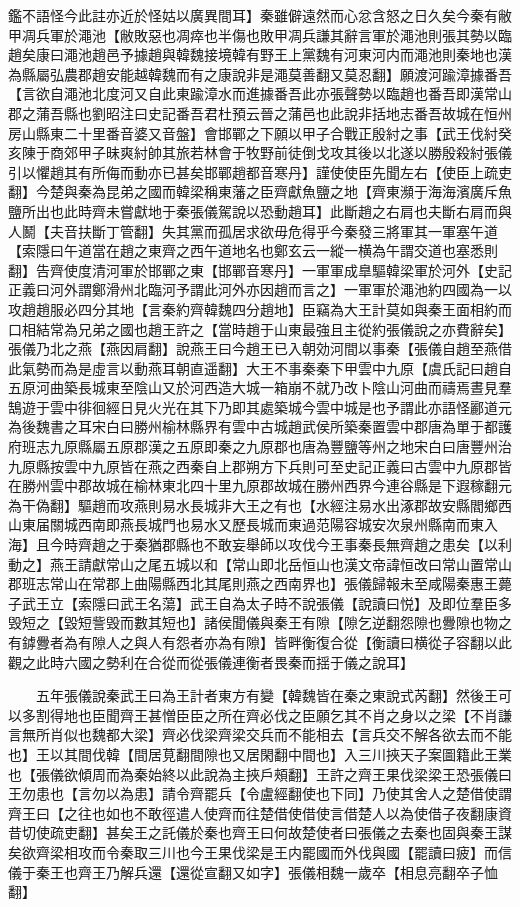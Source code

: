 鑑不語怪今此註亦近於怪姑以廣異間耳】秦雖僻遠然而心忿含怒之日久矣今秦有敝甲凋兵軍於澠池【敝敗惡也凋瘁也半傷也敗甲凋兵謙其辭言軍於澠池則張其勢以臨趙矣康曰澠池趙邑予據趙與韓魏接境韓有野王上黨魏有河東河内而澠池則秦地也漢為縣屬弘農郡趙安能越韓魏而有之康說非是澠莫善翻又莫忍翻】願渡河踰漳據番吾【言欲自澠池北度河又自此東踰漳水而進據番吾此亦張聲勢以臨趙也番吾即漢常山郡之蒲吾縣也劉昭注曰史記番吾君杜預云晉之蒲邑也此說非括地志番吾故城在恒州房山縣東二十里番音婆又音盤】會邯鄲之下願以甲子合戰正殷紂之事【武王伐紂癸亥陳于商郊甲子昧爽紂帥其旅若林會于牧野前徒倒戈攻其後以北遂以勝殷殺紂張儀引以懼趙其有所侮而動亦已甚矣邯鄲趙都音寒丹】謹使使臣先聞左右【使臣上疏吏翻】今楚與秦為昆弟之國而韓梁稱東藩之臣齊獻魚鹽之地【齊東瀕于海海濱廣斥魚鹽所出也此時齊未嘗獻地于秦張儀駕說以恐動趙耳】此斷趙之右肩也夫斷右肩而與人鬭【夫音扶斷丁管翻】失其黨而孤居求欲毋危得乎今秦發三將軍其一軍塞午道【索隱曰午道當在趙之東齊之西午道地名也鄭玄云一縱一横為午謂交道也塞悉則翻】告齊使度清河軍於邯鄲之東【邯鄲音寒丹】一軍軍成臯驅韓梁軍於河外【史記正義曰河外謂鄭滑州北臨河予謂此河外亦因趙而言之】一軍軍於澠池約四國為一以攻趙趙服必四分其地【言秦約齊韓魏四分趙地】臣竊為大王計莫如與秦王面相約而口相結常為兄弟之國也趙王許之【當時趙于山東最強且主從約張儀說之亦費辭矣】張儀乃北之燕【燕因肩翻】說燕王曰今趙王已入朝効河間以事秦【張儀自趙至燕借此氣勢而為是虛言以動燕耳朝直遥翻】大王不事秦秦下甲雲中九原【虞氏記曰趙自五原河曲築長城東至陰山又於河西造大城一箱崩不就乃改卜陰山河曲而禱焉晝見羣鵠遊于雲中徘徊經日見火光在其下乃即其處築城今雲中城是也予謂此亦語怪酈道元為後魏書之耳宋白曰勝州榆林縣界有雲中古城趙武侯所築秦置雲中郡唐為單于都護府班志九原縣屬五原郡漢之五原即秦之九原郡也唐為豐鹽等州之地宋白曰唐豐州治九原縣按雲中九原皆在燕之西秦自上郡朔方下兵則可至史記正義曰古雲中九原郡皆在勝州雲中郡故城在榆林東北四十里九原郡故城在勝州西界今連谷縣是下遐稼翻元為干偽翻】驅趙而攻燕則易水長城非大王之有也【水經注易水出涿郡故安縣閻鄉西山東届關城西南即燕長城門也易水又歷長城而東過范陽容城安次泉州縣南而東入海】且今時齊趙之于秦猶郡縣也不敢妄舉師以攻伐今王事秦長無齊趙之患矣【以利動之】燕王請獻常山之尾五城以和【常山即北岳恒山也漢文帝諱恒改曰常山置常山郡班志常山在常郡上曲陽縣西北其尾則燕之西南界也】張儀歸報未至咸陽秦惠王薨子武王立【索隱曰武王名蕩】武王自為太子時不說張儀【說讀曰悦】及即位羣臣多毁短之【毀短訾毁而數其短也】諸侯聞儀與秦王有隙【隙乞逆翻怨隙也釁隙也物之有鏬釁者為有隙人之與人有怨者亦為有隙】皆畔衡復合從【衡讀曰横從子容翻以此觀之此時六國之勢利在合從而從張儀連衡者畏秦而揺于儀之說耳】

　　五年張儀說秦武王曰為王計者東方有變【韓魏皆在秦之東說式芮翻】然後王可以多割得地也臣聞齊王甚憎臣臣之所在齊必伐之臣願乞其不肖之身以之梁【不肖謙言無所肖似也魏都大梁】齊必伐梁齊梁交兵而不能相去【言兵交不解各欲去而不能也】王以其間伐韓【間居莧翻間隙也又居閑翻中間也】入三川挾天子案圖籍此王業也【張儀欲傾周而為秦始終以此說為主挾戶頰翻】王許之齊王果伐梁梁王恐張儀曰王勿患也【言勿以為患】請令齊罷兵【令盧經翻使也下同】乃使其舍人之楚借使謂齊王曰【之往也如也不敢徑遣人使齊而往楚借使借使言借楚人以為使借子夜翻康資昔切使疏吏翻】甚矣王之託儀於秦也齊王曰何故楚使者曰張儀之去秦也固與秦王謀矣欲齊梁相攻而令秦取三川也今王果伐梁是王内罷國而外伐與國【罷讀曰疲】而信儀于秦王也齊王乃解兵還【還從宣翻又如字】張儀相魏一歲卒【相息亮翻卒子恤翻】


